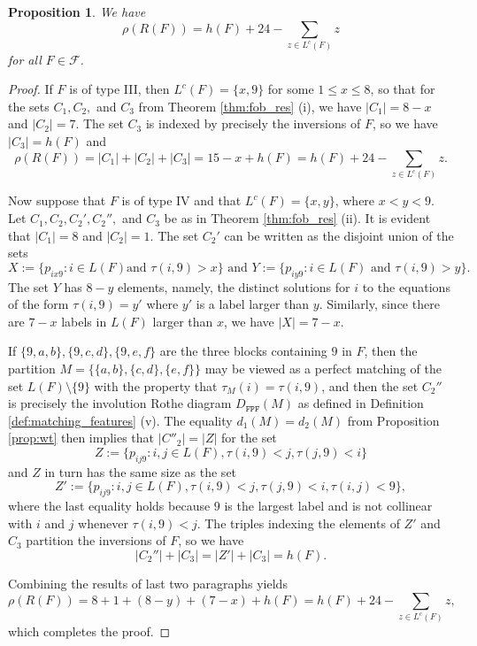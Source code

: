 \documentclass[11pt]{amsart}
\theoremstyle{plain}
\newtheorem{prop}[theorem]{Proposition}
\theoremstyle{definition}
\theoremstyle{remark}
\numberwithin{equation}{section}
\newcommand{\lc}{L^c}
\newcommand{\calf}{\mathcal{F}}
\newcommand{\abs}[1]{\lvert #1 \rvert}
\begin{document}
\begin{prop}\label{prop:fob_level}
 We have
\[
\rho(R(F)) =h(F)+ 24 - \sum_{z\in\lc(F)} z \]
for all $F\in \calf$.
\end{prop}


\begin{proof}
  If $F$ is of type III, then $\lc(F)=\{x,9\}$ for some $1\le x\le 8$, so that
  for the sets $C_1, C_2,$ and $C_3$ from Theorem \ref{thm:fob_res} (i), we have
  $\abs{C_1}=8-x$
  and $\abs{C_2}=7$. 
  The set $C_3$ is indexed by precisely the inversions of $F$, so
  we have
  $\abs{C_3}=h(F)$ 
  and 
  \[
    \rho(R(F))=\abs{C_1}+\abs{C_2}+\abs{C_3}=15-x+h(F)=h(F)+24-\sum_{z\in\lc(F)}z.
  \]

  Now suppose that $F$ is of type IV and that $\lc(F)=\{x,y\}$, where $x<y<9$.
  Let $C_1, C_2, C_2', C_2'',$ and $C_3$ be as in Theorem \ref{thm:fob_res}
  (ii). It is evident that $\abs{C_1}=8$ and $\abs{C_2}=1$. The set $C_2'$ can
  be written as the disjoint union of the sets 
  \[X:=\{p_{ix9}: i\in L(F) \text{
    and } 
  \tau(i,9)>x\} \text{ and } Y:=\{p_{iy9}: i\in L(F) \text{ and }
\tau(i,9)>y\}.\] The set
  $Y$ has $8-y$ elements, namely, the distinct solutions for $i$ to the equations
  of the form $\tau(i,9)=y'$ where $y'$ is a label larger than
  $y$. Similarly, since there are $7-x$ labels in $L(F)$ larger than $x$, we have
  $\abs{X}=7-x$. 

  If $\{9,a,b\}, \{9,c,d\}, \{9,e,f\}$ are the three blocks
  containing $9$ in $F$, then the partition $M=\{\{a,b\}, \{c,d\}, \{e,f\}\}$
  may be viewed as a perfect matching of the set $L(F)\setminus\{9\}$ with the
  property that $\tau_M(i)=\tau(i,9)$, and then
  the set $C_2''$ is precisely the involution Rothe diagram $D_{\texttt{FPF}}(M)$ as defined
  in Definition \ref{def:matching_features} (v). The equality $d_1(M)=d_2(M)$
  from Proposition \ref{prop:wt} then implies that $\abs{C''_2}=\abs{Z}$ for the
  set
  \[
    Z:=\{p_{ij9}: i,j\in L(F), \tau(i,9)<j, \tau(j,9)<i\}
  \]
  and $Z$ in turn has the same size as the set
\[
  Z':= \{p_{ij9}: i,j\in L(F), \tau(i,9)<j, \tau(j,9)<i, \tau(i,j)<9\},
  \]
  where the last equality holds because $9$ is the largest label and is not
  collinear with $i$ and $j$ whenever $\tau(i,9)<j$. The triples indexing the elements of $Z'$ and $C_3$
  partition the inversions of $F$, so we have 
  \[
    \abs{C_2''}+\abs{C_3}=\abs{Z'}+\abs{C_3}=h(F).
  \]

  Combining the results of last two paragraphs yields
  \[
    \rho(R(F))=8+1+(8-y)+(7-x)+h(F)= h(F)+24-\sum_{z\in \lc(F)} z,
  \]
  which completes the proof. 
\end{proof}
\end{document}
